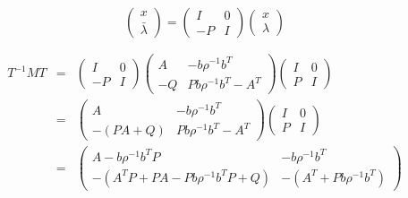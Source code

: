             \begin{equation*}
                \begin{pmatrix}
                    x \\
                    \bar{\lambda}
                \end{pmatrix} =
                \begin{pmatrix}
                    I & 0 \\
                    -P & I
                \end{pmatrix}
                \begin{pmatrix}
                    x \\
                    \lambda
                \end{pmatrix}
            \end{equation*}

            \begin{eqnarray*}
                T^{-1} M T & = &
                \begin{pmatrix}
                    I & 0 \\
                    -P & I
                \end{pmatrix}
                \begin{pmatrix}
                    A & -b \rho^{-1} b^T \\
                    -Q & P b \rho^{-1} b^T - A^T
                \end{pmatrix}
                \begin{pmatrix}
                    I & 0 \\
                    P & I
                \end{pmatrix} \\
                & = &
                \begin{pmatrix}
                    A & -b \rho^{-1} b^T \\
                    -(PA + Q) & P b \rho^{-1} b^T - A^T
                \end{pmatrix}
                \begin{pmatrix}
                    I & 0 \\
                    P & I
                \end{pmatrix} \\
                & = &
                \begin{pmatrix}
                    A - b \rho^{-1} b^T P & -b \rho^{-1} b^T \\
                    -(A^TP + PA - Pb \rho^{-1} b^T P + Q) & - (A^T + P b \rho^{-1} b^T)
                \end{pmatrix}
            \end{eqnarray*}

